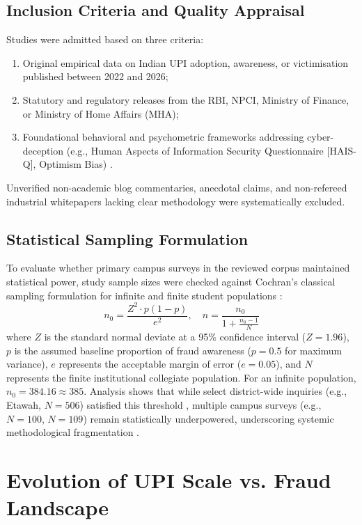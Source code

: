 \documentclass[journal,10pt,twocolumn]{IEEEtran}
\begin{document}
\subsection{Inclusion Criteria and Quality Appraisal}
Studies were admitted based on three criteria:
\begin{enumerate}
    \item Original empirical data on Indian UPI adoption, awareness, or victimisation published between 2022 and 2026;
    \item Statutory and regulatory releases from the RBI, NPCI, Ministry of Finance, or Ministry of Home Affairs (MHA);
    \item Foundational behavioral and psychometric frameworks addressing cyber-deception (e.g., Human Aspects of Information Security Questionnaire [HAIS-Q], Optimism Bias) \cite{arxiv2024, emerald2024, sciencedirect2024, systems2024}.
\end{enumerate}
Unverified non-academic blog commentaries, anecdotal claims, and non-refereed industrial whitepapers lacking clear methodology were systematically excluded.

\subsection{Statistical Sampling Formulation}
To evaluate whether primary campus surveys in the reviewed corpus maintained statistical power, study sample sizes were checked against Cochran's classical sampling formulation for infinite and finite student populations \cite{cochran1977}:
\begin{equation}
n_0 = \frac{Z^2 \cdot p(1-p)}{e^2}, \quad n = \frac{n_0}{1 + \frac{n_0 - 1}{N}}
\end{equation}
where $Z$ is the standard normal deviate at a 95\% confidence interval ($Z=1.96$), $p$ is the assumed baseline proportion of fraud awareness ($p=0.5$ for maximum variance), $e$ represents the acceptable margin of error ($e=0.05$), and $N$ represents the finite institutional collegiate population. For an infinite population, $n_0 = 384.16 \approx 385$. Analysis shows that while select district-wide inquiries (e.g., Etawah, $N=506$) satisfied this threshold \cite{exploratio2026}, multiple campus surveys (e.g., $N=100$, $N=109$) remain statistically underpowered, underscoring systemic methodological fragmentation \cite{karkera2024, roy2026}.

\section{Evolution of UPI Scale vs. Fraud Landscape}
\end{document}
